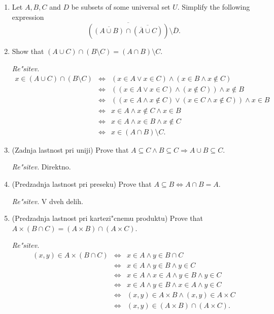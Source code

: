 \documentclass[11pt,paper=b5,footinclude,headinclude]{scrbook} %
\theoremstyle{remark}
\theoremstyle{definition} %
\theoremstyle{theorem} %
\begin{document}
\begin{enumerate}
\item Let  $A, B, C$ and $D$  be subsets of some universal set  $U$. Simplify the following expression
$$\overline{(\overline{(A\cup B)} \cap \overline{(\overline{A} \cup C)})}\setminus \overline{D}.$$

\item Show that $(A\cup C)\cap (B\setminus C) = (A\cap B)\setminus C$.

\emph{ Re"sitev.} 
\begin{eqnarray*}
x\in (A\cup C)\cap (B\setminus C) &\Leftrightarrow & (x\in A \vee x\in C) \wedge (x\in B \wedge x\notin C)\\
 &\Leftrightarrow & ((x\in A \vee x\in C) \wedge (x\notin C))\wedge x\notin B\\
&\Leftrightarrow & ((x\in A \wedge x\notin C) \vee (x\in C \wedge x\notin C)) \wedge
 x\in B\\
&\Leftrightarrow & x\in A \wedge x\notin C  \wedge x\in B\\
&\Leftrightarrow & x\in A \wedge x\in B  \wedge x\notin C \\
&\Leftrightarrow & x \in (A\cap B)\setminus C. 
\end{eqnarray*}

\item (Zadnja lastnost pri uniji) Prove that $A\subseteq C  \wedge B\subseteq C \Rightarrow A\cup B\subseteq C$.

\emph{ Re"sitev.} Direktno.

\item (Predzadnja lastnost pri preseku) Prove that $A\subseteq  B \Leftrightarrow A\cap B = A$.

\emph{ Re"sitev.} V dveh delih.

\item (Predzadnja lastnost pri kartezi"cnemu produktu) Prove that $A\times (B\cap C) = (A\times B)\cap (A\times C)$.

\emph{ Re"sitev.} 
\begin{eqnarray*}
(x,y)\in A\times (B\cap C) &\Leftrightarrow & x \in A \wedge y\in B\cap C\\
&\Leftrightarrow & x \in A \wedge y\in B  \wedge y\in C\\
&\Leftrightarrow & x \in A \wedge x \in A\wedge y\in B  \wedge y\in C\\
&\Leftrightarrow & x \in A \wedge  y\in B  \wedge x \in A\wedge y\in C\\
&\Leftrightarrow & (x,y) \in A\times B \wedge  (x,y) \in A\times C\\
&\Leftrightarrow & (x,y) \in (A\times B)\cap   (A\times C).
\end{eqnarray*}


\end{enumerate}
\end{document}
